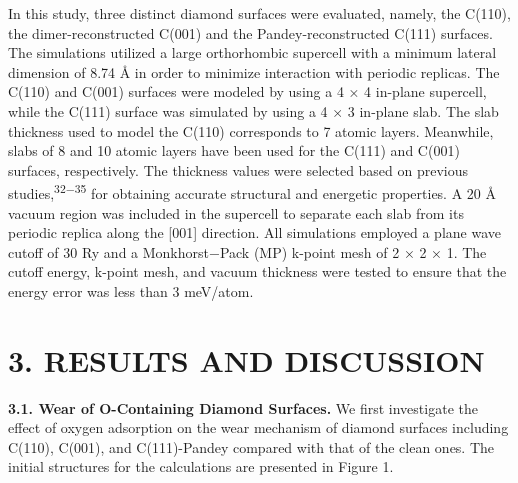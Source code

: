\documentclass{article}
\begin{document}
In this study, three distinct diamond surfaces were evaluated, namely, the C(110), the dimer-reconstructed C(001) and the Pandey-reconstructed C(111) surfaces. The simulations utilized a large orthorhombic supercell with a minimum lateral dimension of 8.74 Å in order to minimize interaction with periodic replicas. The C(110) and C(001) surfaces were modeled by using a 4 × 4 in-plane supercell, while the C(111) surface was simulated by using a 4 × 3 in-plane slab. The slab thickness used to model the C(110) corresponds to 7 atomic layers. Meanwhile, slabs of 8 and 10 atomic layers have been used for the C(111) and C(001) surfaces, respectively. The thickness values were selected based on previous studies,\textsuperscript{32−35} for obtaining accurate structural and energetic properties. A 20 Å vacuum region was included in the supercell to separate each slab from its periodic replica along the [001] direction. All simulations employed a plane wave cutoff of 30 Ry and a Monkhorst−Pack (MP) k-point mesh of 2 × 2 × 1. The cutoff energy, k-point mesh, and vacuum thickness were tested to ensure that the energy error was less than 3 meV/atom.

\section*{3. RESULTS AND DISCUSSION}

\noindent\textbf{3.1. Wear of O-Containing Diamond Surfaces.} We first investigate the effect of oxygen adsorption on the wear mechanism of diamond surfaces including C(110), C(001), and C(111)-Pandey compared with that of the clean ones. The initial structures for the calculations are presented in Figure 1.
\end{document}
